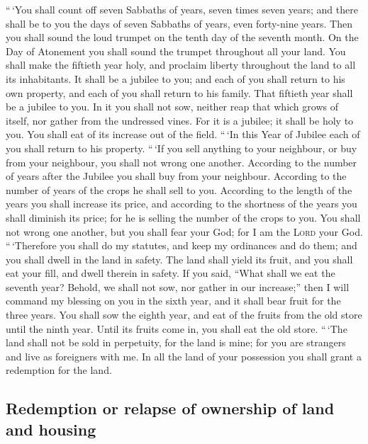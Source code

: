  ``\,`You shall count off seven Sabbaths of years, seven
times seven years; and there shall be to you the days of seven Sabbaths
of years, even forty-nine years.  Then you shall sound the
loud trumpet on the tenth day of the seventh month. On the Day of
Atonement you shall sound the trumpet throughout all your land.
 You shall make the fiftieth year holy, and proclaim
liberty throughout the land to all its inhabitants. It shall be a
jubilee to you; and each of you shall return to his own property, and
each of you shall return to his family.  That fiftieth
year shall be a jubilee to you. In it you shall not sow, neither reap
that which grows of itself, nor gather from the undressed vines.
 For it is a jubilee; it shall be holy to you. You shall
eat of its increase out of the field.  ``\,`In this Year
of Jubilee each of you shall return to his property. 
``\,`If you sell anything to your neighbour, or buy from your neighbour,
you shall not wrong one another.  According to the number
of years after the Jubilee you shall buy from your neighbour. According
to the number of years of the crops he shall sell to you.
 According to the length of the years you shall increase
its price, and according to the shortness of the years you shall
diminish its price; for he is selling the number of the crops to you.
 You shall not wrong one another, but you shall fear your
God; for I am the \textsc{Lord} your God.  ``\,`Therefore
you shall do my statutes, and keep my ordinances and do them; and you
shall dwell in the land in safety.  The land shall yield
its fruit, and you shall eat your fill, and dwell therein in safety.
 If you said, ``What shall we eat the seventh year?
Behold, we shall not sow, nor gather in our increase;'' 
then I will command my blessing on you in the sixth year, and it shall
bear fruit for the three years.  You shall sow the eighth
year, and eat of the fruits from the old store until the ninth year.
Until its fruits come in, you shall eat the old store. 
``\,`The land shall not be sold in perpetuity, for the land is mine; for
you are strangers and live as foreigners with me.  In all
the land of your possession you shall grant a redemption for the land.

\hypertarget{redemption-or-relapse-of-ownership-of-land-and-housing}{%
\subsection{Redemption or relapse of ownership of land and
housing}\label{redemption-or-relapse-of-ownership-of-land-and-housing}}

